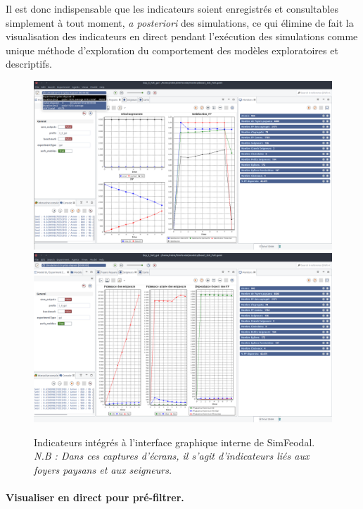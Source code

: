 Il est donc indispensable que les indicateurs soient enregistrés et consultables simplement à tout moment, \textit{a posteriori} des simulations, ce qui élimine de fait la visualisation des indicateurs en direct pendant l'exécution des simulations comme unique méthode d'exploration du comportement des modèles exploratoires et descriptifs.


\begin{figure}[H]
	\captionsetup{width=\linewidth}
	\includegraphics[width=\linewidth]{img/SimFeodal_GUI_FP.png}
	\includegraphics[width=\linewidth]{img/SimFeodal_GUI_seigneurs.png}
	\caption[Indicateurs intégrés à l'interface graphique interne de SimFeodal.]{Indicateurs intégrés à l'interface graphique interne de SimFeodal.\\
	\textit{N.B : Dans ces captures d'écrans, il s'agit d'indicateurs liés aux foyers paysans et aux seigneurs.}}
	\label{fig:simfeodal_gui_indicateurs}
\end{figure}

\paragraph{Visualiser en direct pour pré-filtrer.}

